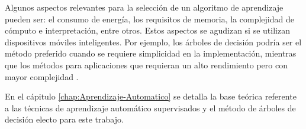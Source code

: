 Algunos aspectos relevantes para la selección de un algoritmo de aprendizaje
pueden ser: el consumo de energía, los requisitos de memoria, la complejidad
de cómputo e interpretación, entre otros. Estos aspectos se agudizan
si se utilizan dispositivos móviles inteligentes. Por ejemplo, los
árboles de decisión podría ser el método preferido cuando se requiere
simplicidad en la implementación, mientras que los métodos 
para aplicaciones que requieran un alto rendimiento pero con mayor
complejidad \cite{ReyesOrtiz2015}.

En el cápitulo \ref{chap:Aprendizaje-Automatico} se detalla la base
teórica referente a las técnicas de aprendizaje automático supervisados
y el método de árboles de decisión electo para este trabajo.
